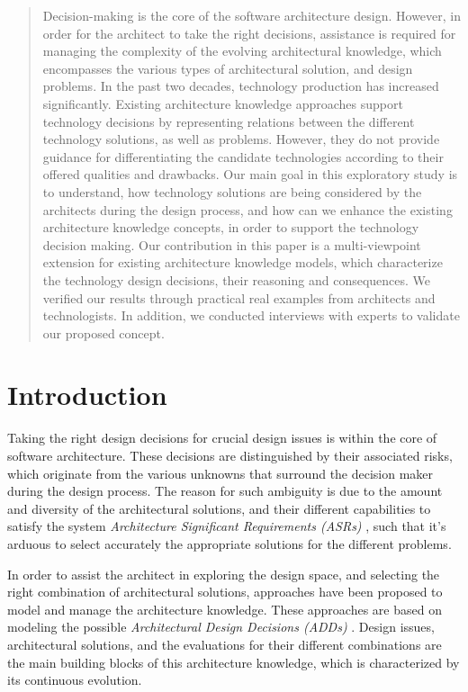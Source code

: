 \documentclass[conference]{IEEEtran}
\begin{document}
\begin{abstract}
Decision-making is the core of the software architecture design. 
However, in order for the architect to take the right decisions, 
assistance is required for managing the complexity of the evolving
architectural knowledge, which encompasses the various types of architectural
solution, and design problems. In the past two decades, technology production
has increased significantly. Existing architecture knowledge approaches
support technology decisions by representing relations between
the different technology solutions, as well as problems. However, they do not
provide guidance for differentiating the candidate technologies according to
their offered qualities and drawbacks. Our main goal in this exploratory study
is to understand, how technology solutions are being considered by the
architects during the design process, and how can we enhance the existing
architecture knowledge concepts, in order to support the technology decision
making. Our contribution in this paper is a multi-viewpoint extension for
existing architecture knowledge models, which characterize the technology design
decisions, their reasoning and consequences. We verified our results through
practical real examples from architects and technologists. In addition, we
conducted interviews with experts to validate our proposed concept.
\end{abstract}

\section{Introduction}
Taking the right design decisions for crucial design issues is within the core
of software architecture. These decisions are distinguished by their
associated risks, which originate from the various unknowns that surround the
decision maker during the design process. The reason for such ambiguity is due
to the amount and diversity of the architectural solutions, and their different
capabilities to satisfy the system \textit{Architecture Significant Requirements
(ASRs)} \cite{BabarASR2013}, such that it's arduous to select accurately the
appropriate solutions for the different problems.

In order to assist the architect in exploring the design space, and
selecting the right combination of architectural solutions, approaches have been
proposed to model and manage the architecture knowledge. These approaches are
based on modeling the possible \textit{Architectural Design Decisions (ADDs)}
\cite{Jansen2005}. Design issues, architectural solutions, and the evaluations
for their different combinations are the main building blocks of this
architecture knowledge, which is characterized by its continuous evolution.
\end{document}

